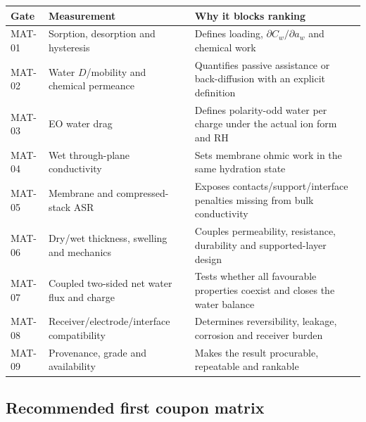\documentclass[10pt,a4paper]{article}
\begin{document}
\begin{center}\small
\begin{tabularx}{\textwidth}{@{}p{17mm}p{45mm}Y@{}}
\toprule
\textbf{Gate} & \textbf{Measurement} & \textbf{Why it blocks ranking} \\
\midrule
MAT-01 & Sorption, desorption and hysteresis & Defines loading, $\partial C_w/\partial a_w$ and chemical work \\
MAT-02 & Water $D$/mobility and chemical permeance & Quantifies passive assistance or back-diffusion with an explicit definition \\
MAT-03 & EO water drag & Defines polarity-odd water per charge under the actual ion form and RH \\
MAT-04 & Wet through-plane conductivity & Sets membrane ohmic work in the same hydration state \\
MAT-05 & Membrane and compressed-stack ASR & Exposes contacts/support/interface penalties missing from bulk conductivity \\
MAT-06 & Dry/wet thickness, swelling and mechanics & Couples permeability, resistance, durability and supported-layer design \\
MAT-07 & Coupled two-sided net water flux and charge & Tests whether all favourable properties coexist and closes the water balance \\
MAT-08 & Receiver/electrode/interface compatibility & Determines reversibility, leakage, corrosion and receiver burden \\
MAT-09 & Provenance, grade and availability & Makes the result procurable, repeatable and rankable \\
\bottomrule
\end{tabularx}
\end{center}

\subsection{Recommended first coupon matrix}
\end{document}
